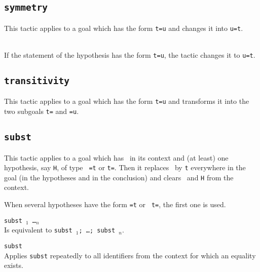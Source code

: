 \begin{coq_example*}
\begin{ErrMsgs}
\item {}
\item {}
\end{ErrMsgs}

\subsection{\tt symmetry
}
This tactic applies to a goal which has the form {\tt t=u} and changes it
into {\tt u=t}.

\\
If the statement of the hypothesis {\ident} has the form {\tt t=u},
the tactic changes it to {\tt u=t}.

\subsection{\tt transitivity \term
{}}
This tactic applies to a goal which has the form {\tt t=u}
and transforms it into the two subgoals
{\tt t={\term}} and {\tt {\term}=u}.

\subsection{\tt subst {\ident}
}

This tactic applies to a goal which has \ident\ in its context and
(at least) one hypothesis, say {\tt H}, of type {\tt
  \ident=t} or {\tt t=\ident}. Then it replaces
\ident\ by {\tt t} everywhere in the goal (in the hypotheses
and in the conclusion) and clears \ident\ and {\tt H} from the context.

\Rem
When several hypotheses have the form {\tt \ident=t} or {\tt
  t=\ident}, the first one is used.

\begin{Variants}
  \item {\tt subst \ident$_1$ \dots \ident$_n$} \\
    Is equivalent to {\tt subst \ident$_1$; \dots; subst \ident$_n$}.
  \item {\tt subst} \\
    Applies {\tt subst} repeatedly to all identifiers from the context
    for which an equality exists.
\end{Variants}


\end{coq_example*}
